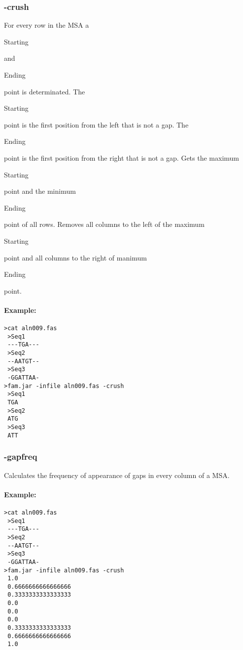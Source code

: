 \documentclass[a4paper, twoside,10pt]{article}
\begin{document}
\subsubsection{-crush}
For every row in the MSA a \begin{tt}Starting\end{tt} and \begin{tt}
Ending\end{tt} point is determinated. The \begin{tt}Starting\end{tt} point is
the first position from the left that is not a gap. The \begin{tt}Ending\end{tt}
point is the first position from the right that is not a gap.
Gets the maximum \begin{tt}Starting\end{tt} point and the minimum  
\begin{tt}Ending\end{tt} point of all rows. Removes all columns to the left of
the maximum \begin{tt}Starting\end{tt} point and all columns to the right of
manimum \begin{tt}Ending\end{tt} point.
\paragraph{Example:}
\begin{verbatim}
>cat aln009.fas
 >Seq1
 ---TGA---
 >Seq2
 --AATGT--
 >Seq3
 -GGATTAA-
>fam.jar -infile aln009.fas -crush
 >Seq1
 TGA
 >Seq2
 ATG
 >Seq3
 ATT
\end{verbatim}

\subsubsection{-gapfreq}
Calculates the frequency of appearance of gaps in every column of a MSA.
\paragraph{Example:}
\begin{verbatim}
>cat aln009.fas
 >Seq1
 ---TGA---
 >Seq2
 --AATGT--
 >Seq3
 -GGATTAA-
>fam.jar -infile aln009.fas -crush
 1.0
 0.6666666666666666
 0.3333333333333333
 0.0
 0.0
 0.0
 0.3333333333333333
 0.6666666666666666
 1.0
\end{verbatim}
\end{document}
